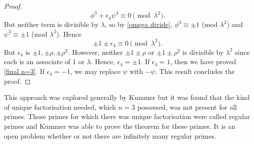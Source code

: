 \documentclass{article}
\theoremstyle{definition}
\theoremstyle{definition}
\theoremstyle{definition}
\begin{document}
\begin{proof}
$$\phi^3 + \epsilon_4 \psi^3 \equiv 0 \pmod{\lambda^2}.
$$
But neither term is divisible by $\lambda$, so by \ref{omega divide}, $\phi^3\equiv\pm1$ (mod $\lambda^2$) and $\psi^3\equiv\pm1$ (mod $\lambda^2$). 
\newline\newline
Hence $$
\pm 1 \pm \epsilon_4 \equiv 0 \pmod{\lambda^2}.
$$
 But $\epsilon_4$ is $\pm1,\pm\rho,\pm\rho^2$. However, neither $\pm1\pm\rho$ or $\pm1\pm\rho^2$ is divisible by $\lambda^2$ since each is an associate of 1 or $\lambda$. Hence, $\epsilon_4=\pm1$. If $\epsilon_4=1$, then we have proved \ref{final n=3}. If $\epsilon_4=-1$, we may replace $\psi$ with $-\psi$. This result concludes the proof.
    \end{proof}

This approach was explored generally by Kummer but it was found that the kind of unique factorisation needed, which $n=3$ possessed, was not present for all primes. Those primes for which there was unique factorisation were called regular primes and Kummer was able to prove the theorem for these primes. It is an open problem whether or not there are infinitely many regular primes.
\end{document}
